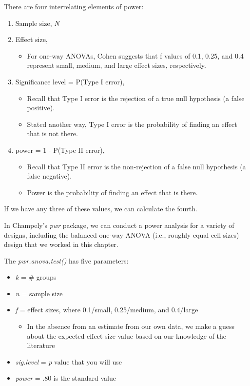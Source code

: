 \documentclass[
  english,
]{book}
\providecommand{\tightlist}{%
  \setlength{\itemsep}{0pt}\setlength{\parskip}{0pt}}
\begin{document}
There are four interrelating elements of power:

\begin{enumerate}
\def\labelenumi{\arabic{enumi}.}
\tightlist
\item
  Sample size, \emph{N}
\item
  Effect size,

  \begin{itemize}
  \tightlist
  \item
    For one-way ANOVAs, Cohen suggests that f values of 0.1, 0.25, and 0.4 represent small, medium, and large effect sizes, respectively.
  \end{itemize}
\item
  Significance level = P(Type I error),

  \begin{itemize}
  \tightlist
  \item
    Recall that Type I error is the rejection of a true null hypothesis (a false positive).
  \item
    Stated another way, Type I error is the probability of finding an effect that is not there.
  \end{itemize}
\item
  power = 1 - P(Type II error),

  \begin{itemize}
  \tightlist
  \item
    Recall that Type II error is the non-rejection of a false null hypothesis (a false negative).
  \item
    Power is the probability of finding an effect that is there.
  \end{itemize}
\end{enumerate}

If we have any three of these values, we can calculate the fourth.

In Champely's \emph{pwr} package, we can conduct a power analysis for a variety of designs, including the balanced one-way ANOVA (i.e., roughly equal cell sizes) design that we worked in this chapter.

The \emph{pwr.anova.test()} has five parameters:

\begin{itemize}
\tightlist
\item
  \emph{k} = \# groups
\item
  \emph{n} = sample size
\item
  \emph{f} = effect sizes, where 0.1/small, 0.25/medium, and 0.4/large

  \begin{itemize}
  \tightlist
  \item
    In the absence from an estimate from our own data, we make a guess about the expected effect size value based on our knowledge of the literature
  \end{itemize}
\item
  \emph{sig.level} = \emph{p} value that you will use
\item
  \emph{power} = .80 is the standard value
\end{itemize}
\end{document}
